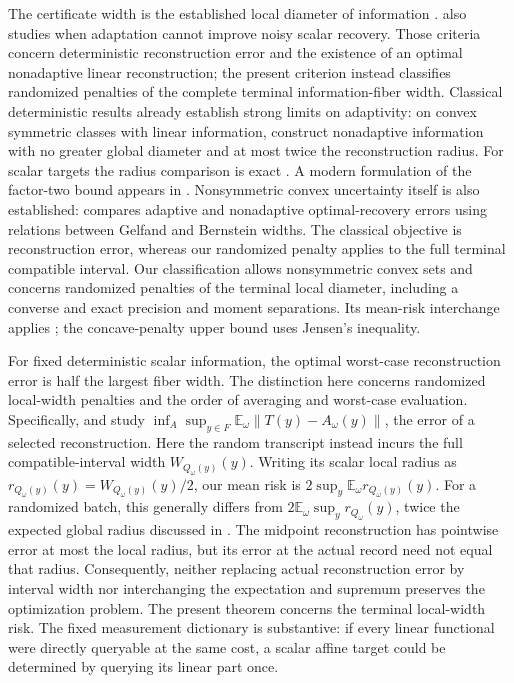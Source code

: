 The certificate width is the established local diameter of information
\citep[Section~4.1]{novak2008}.
\citet[Theorems~2--3 and~5]{osipenko} also studies when adaptation cannot
improve noisy scalar recovery. Those criteria concern deterministic
reconstruction error and the existence of an optimal nonadaptive linear
reconstruction; the present criterion instead classifies randomized
penalties of the complete terminal information-fiber width.
Classical deterministic results already establish strong limits on
adaptivity: on convex symmetric classes with linear information,
\citet[Theorem~4.4]{novak2008} construct nonadaptive information with
no greater global diameter and at most twice the reconstruction radius.
For scalar targets the radius comparison is exact
\citep[Theorem~4.5]{novak2008}. A modern formulation of the factor-two
bound appears in \citet[Proposition~4.1]{krieg2025}.
Nonsymmetric convex uncertainty itself is also established:
\citet{novak1995} compares adaptive and nonadaptive optimal-recovery
errors using relations between Gelfand and Bernstein widths. The
classical objective is reconstruction error, whereas our randomized
penalty applies to the full terminal compatible interval. Our classification allows nonsymmetric convex sets and concerns randomized
penalties of the terminal local diameter, including a converse and exact
precision and moment separations. Its mean-risk interchange applies
\citet[Theorem~3.4]{sion1958}; the concave-penalty upper bound uses Jensen's
inequality.

For fixed deterministic scalar information, the optimal worst-case
reconstruction error is half the largest fiber width. The distinction here
concerns randomized local-width penalties and the order of averaging and
worst-case evaluation. Specifically, \citet[Section~2]{krieg2025}
and \citet[Section~9.1, Eq.~(9.15), author manuscript v2]{krieg2026}
study $\inf_A\sup_{y\in F}\mathbb E_\omega
\lVert T(y)-A_\omega(y)\rVert$, the error of a selected reconstruction.
Here the random transcript instead incurs the full compatible-interval
width $W_{Q_\omega(y)}(y)$.
Writing its scalar local radius as $r_{Q_\omega(y)}(y)=W_{Q_\omega(y)}(y)/2$,
our mean risk is $2\sup_y\mathbb E_\omega r_{Q_\omega(y)}(y)$.
For a randomized batch, this generally differs from
$2\mathbb E_\omega\sup_y r_{Q_\omega}(y)$, twice the expected global radius
discussed in \citet[Eq.~(2.4), Remark~6.1 and Section~6.1, author manuscript v2]{krieg2026}.
The midpoint reconstruction has pointwise error at most the local radius,
but its error at the actual record need not equal that radius. Consequently,
neither replacing actual reconstruction error by interval width nor
interchanging the expectation and supremum preserves the optimization
problem. The present theorem concerns the terminal local-width risk.
The fixed measurement dictionary is substantive: if every linear
functional were directly queryable at the same cost, a scalar affine
target could be determined by querying its linear part once.

